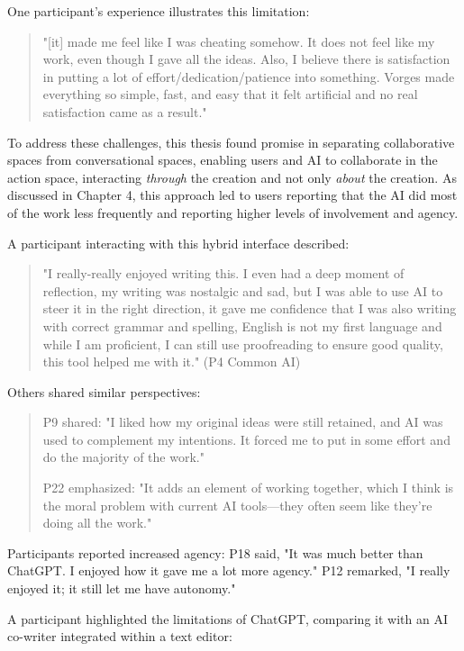 One participant's experience illustrates this limitation:

\begin{quote}
"[it] made me feel like I was cheating somehow. It does not feel like my work, even though I gave all the ideas. Also, I believe there is satisfaction in putting a lot of effort/dedication/patience into something. Vorges made everything so simple, fast, and easy that it felt artificial and no real satisfaction came as a result."
\end{quote}

To address these challenges, this thesis found promise in separating collaborative spaces from conversational spaces, enabling users and AI to collaborate in the action space, interacting \textit{through} the creation and not only \textit{about} the creation. As discussed in Chapter 4, this approach led to users reporting that the AI did most of the work less frequently and reporting higher levels of involvement and agency.

A participant interacting with this hybrid interface described:

\begin{quote}
"I really-really enjoyed writing this. I even had a deep moment of reflection, my writing was nostalgic and sad, but I was able to use AI to steer it in the right direction, it gave me confidence that I was also writing with correct grammar and spelling, English is not my first language and while I am proficient, I can still use proofreading to ensure good quality, this tool helped me with it." (P4 Common AI)
\end{quote}

Others shared similar perspectives:

\begin{quote}
P9 shared: "I liked how my original ideas were still retained, and AI was used to complement my intentions. It forced me to put in some effort and do the majority of the work."

P22 emphasized: "It adds an element of working together, which I think is the moral problem with current AI tools—they often seem like they're doing all the work."
\end{quote}

Participants reported increased agency: P18 said, "It was much better than ChatGPT. I enjoyed how it gave me a lot more agency." P12 remarked, "I really enjoyed it; it still let me have autonomy."

A participant highlighted the limitations of ChatGPT, comparing it with an AI co-writer integrated within a text editor:

